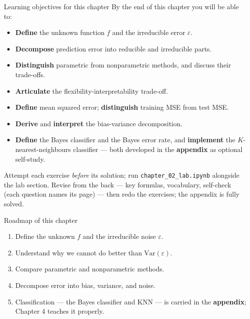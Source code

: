 \documentclass[aspectratio=169,11pt]{beamer}
\begin{document}
\begin{frame}{Learning objectives for this chapter}
  \small
  By the end of this chapter you will be able to:
  \begin{itemize}
    \item \textbf{Define} the unknown function $f$ and the
          irreducible error $\varepsilon$.
    \item \textbf{Decompose} prediction error into reducible and
          irreducible parts.
    \item \textbf{Distinguish} parametric from nonparametric methods,
          and discuss their trade-offs.
    \item \textbf{Articulate} the flexibility-interpretability
          trade-off.
    \item \textbf{Define} mean squared error; \textbf{distinguish}
          training MSE from test MSE.
    \item \textbf{Derive} and \textbf{interpret} the bias-variance
          decomposition.
    \item \textbf{Define} the Bayes classifier and the Bayes error rate,
          and \textbf{implement} the $K$-nearest-neighbours classifier ---
          both developed in the \textbf{appendix} as optional self-study.
  \end{itemize}
  \begin{readme}
    \footnotesize Attempt each exercise \emph{before} its solution; run
    \texttt{chapter\_02\_lab.ipynb} alongside the lab section. Revise from the
    back --- key formulas, vocabulary, self-check (each question names its
    page) --- then redo the exercises; the appendix is fully solved.
  \end{readme}
\end{frame}


\begin{frame}{Roadmap of this chapter}
  \begin{takeaway}
    \begin{enumerate}
      \item Define the unknown $f$ and the irreducible noise $\varepsilon$.
      \item Understand why we cannot do better than $\mathrm{Var}(\varepsilon)$.
      \item Compare parametric and nonparametric methods.
      \item Decompose error into bias, variance, and noise.
      \item Classification --- the Bayes classifier and KNN --- is carried in
            the \textbf{appendix}; Chapter 4 teaches it properly.
    \end{enumerate}
  \end{takeaway}
\end{frame}
\end{document}
